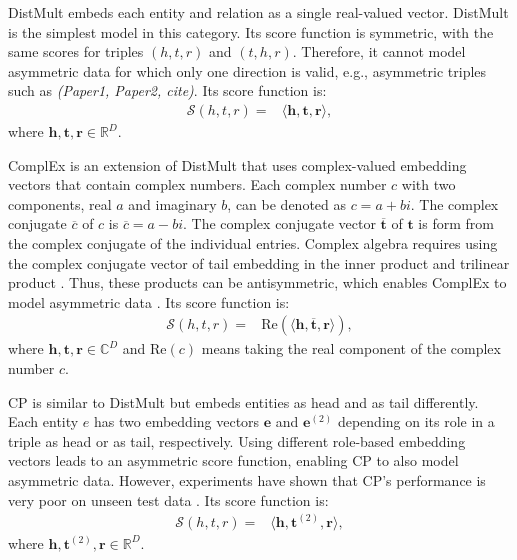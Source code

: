 \documentclass[sigconf,edbt]{acmart-edbt2019}
\def\ve{{\bm{e}}}
\def\vh{{\bm{h}}}
\def\vr{{\bm{r}}}
\def\vt{{\bm{t}}}
\def\gS{{\mathcal{S}}}
\def\sC{{\mathbb{C}}}
\def\sR{{\mathbb{R}}}
\begin{document}
DistMult \cite{yang_embeddingentitiesrelations_2015} embeds each entity and relation as a single real-valued vector. DistMult is the simplest model in this category. Its score function is symmetric, with the same scores for triples $ (h, t, r) $ and $ (t, h, r) $. Therefore, it cannot model asymmetric data for which only one direction is valid, e.g., asymmetric triples such as \textit{(Paper1, Paper2, cite)}. Its score function is:
\begin{equation} \label{eq:distmult}
\begin{split}
\gS(h,t,r) = &\langle \vh, \vt, \vr \rangle,
\end{split}
\end{equation}
where $ \vh, \vt, \vr \in \sR^{D} $.

ComplEx \cite{trouillon_complexembeddingssimple_2016} is an extension of DistMult that uses complex-valued embedding vectors that contain complex numbers. Each complex number $ c $ with two components, real $ a $ and imaginary $ b $, can be denoted as $ c = a + b i $. The complex conjugate $ \overline{c} $ of $ c $ is $ \overline{c} = a - b i $. The complex conjugate vector $ \overline{\vt} $ of $ \vt $ is form from the complex conjugate of the individual entries. Complex algebra requires using the complex conjugate vector of tail embedding in the inner product and trilinear product \cite{ahlfors_complexanalysisintroduction_1953}. Thus, these products can be antisymmetric, which enables ComplEx to model asymmetric data \cite{trouillon_complexembeddingssimple_2016} \cite{trouillon_knowledgegraphcompletion_2017}. Its score function is:
\begin{equation} \label{eq:complex}
\begin{split}
\gS(h,t,r) = &\text{Re}(\langle \vh, \overline{\vt}, \vr \rangle),
\end{split}
\end{equation}
where $ \vh, \vt, \vr \in \sC^{D} $ and Re$ (c) $ means taking the real component of the complex number $ c $.

CP \cite{hitchcock_expressiontensorpolyadic_1927} is similar to DistMult but embeds entities as head and as tail differently. Each entity $ e $ has two embedding vectors $ \ve $ and $ \ve^{(2)} $ depending on its role in a triple as head or as tail, respectively. Using different role-based embedding vectors leads to an asymmetric score function, enabling CP to also model asymmetric data. However, experiments have shown that CP's performance is very poor on unseen test data \cite{lacroix_canonicaltensordecomposition_2018}. Its score function is:
\begin{equation} \label{eq:cp}
\begin{split}
\gS(h,t,r) = &\langle \vh, \vt^{(2)}, \vr \rangle,
\end{split}
\end{equation}
where $ \vh, \vt^{(2)}, \vr \in \sR^{D} $.
\end{document}
